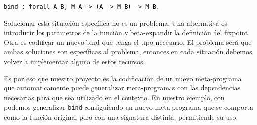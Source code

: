 \begin{lstlisting}
bind : forall A B, M A -> (A -> M B) -> M B.
\end{lstlisting}

Solucionar esta situación específica no es un problema.
Una alternativa es introducir los parámetros de la función y beta-expandir la definición del fixpoint.
Otra es codificar un nuevo bind que tenga el tipo necesario.
El problema será que ambas soluciones son específicas al problema, entonces en cada situación debemos volver a implementar alguno de estos recursos.

Es por eso que nuestro proyecto es la codificación de un nuevo meta-programa \lift{} que automaticamente puede generalizar meta-programas con las dependencias necesarias para que sea utilizado en el contexto.
En nuestro ejemplo, con \lift{} podemos generalizar \lstinline{bind} consiguiendo un nuevo meta-programa que se comporta como la función original pero con una signatura distinta, permitiendo su uso.
